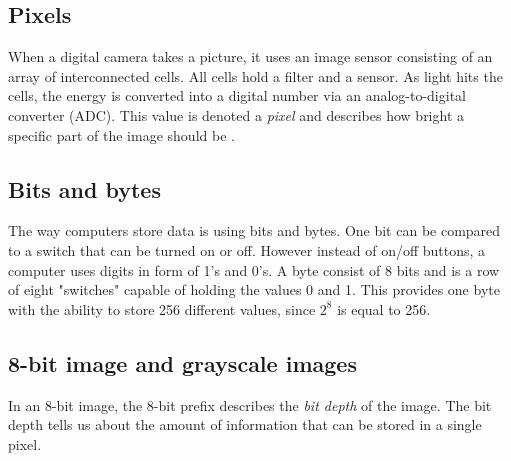 \subsection{Pixels}
When a digital camera takes a picture, it uses an image sensor consisting of an array of interconnected cells. All cells hold a filter and a sensor. As light hits the cells, the energy is converted into a digital number via an analog-to-digital converter (ADC). This value is denoted a \textit{pixel} and describes how bright a specific part of the image should be \citep{ip_book}.

\subsection{Bits and bytes}
The way computers store data is using bits and bytes. One bit can be compared to a switch that can be turned on or off. However instead of on/off buttons, a computer uses digits in form of 1's and 0's. A byte consist of 8 bits and is a row of eight "switches" capable of holding the values 0 and 1. This provides one byte with the ability to store 256 different values, since $2^{8}$ is equal to 256. 




\subsection{8-bit image and grayscale images}
In an 8-bit image, the 8-bit prefix describes the \textit{bit depth} of the image. The bit depth tells us about the amount of information that can be stored in a single pixel.


